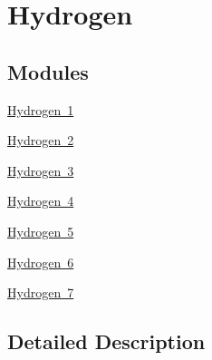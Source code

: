 \hypertarget{group___isotope_const-_hydrogen}{}\section{Hydrogen}
\label{group___isotope_const-_hydrogen}
\subsection*{Modules}
\begin{DoxyCompactItemize}
\item 
\mbox{\hyperlink{group___isotope_const-_hydrogen-_h1}{Hydrogen 1}}
\item 
\mbox{\hyperlink{group___isotope_const-_hydrogen-_h2}{Hydrogen 2}}
\item 
\mbox{\hyperlink{group___isotope_const-_hydrogen-_h3}{Hydrogen 3}}
\item 
\mbox{\hyperlink{group___isotope_const-_hydrogen-_h4}{Hydrogen 4}}
\item 
\mbox{\hyperlink{group___isotope_const-_hydrogen-_h5}{Hydrogen 5}}
\item 
\mbox{\hyperlink{group___isotope_const-_hydrogen-_h6}{Hydrogen 6}}
\item 
\mbox{\hyperlink{group___isotope_const-_hydrogen-_h7}{Hydrogen 7}}
\end{DoxyCompactItemize}


\subsection{Detailed Description}
